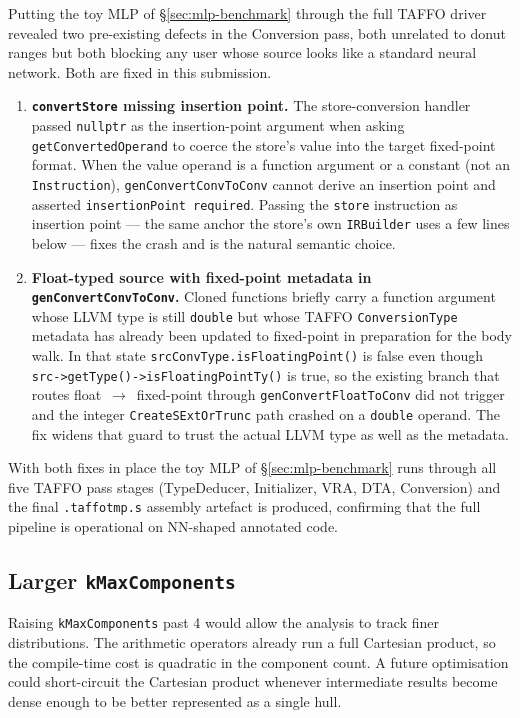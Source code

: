 \documentclass[11pt,a4paper]{article}
\theoremstyle{plain}
\begin{document}
Putting the toy MLP of \S\ref{sec:mlp-benchmark} through the full
TAFFO driver revealed two pre-existing defects in the Conversion
pass, both unrelated to donut ranges but both blocking any user
whose source looks like a standard neural network. Both are fixed
in this submission.

\begin{enumerate}
\item \textbf{\texttt{convertStore} missing insertion point.} The
  store-conversion handler passed \texttt{nullptr} as the
  insertion-point argument when asking \texttt{getConvertedOperand}
  to coerce the store's value into the target fixed-point format.
  When the value operand is a function argument or a constant (not
  an \texttt{Instruction}), \texttt{genConvertConvToConv} cannot
  derive an insertion point and asserted
  \texttt{insertionPoint required}. Passing the \texttt{store}
  instruction as insertion point --- the same anchor the store's
  own \texttt{IRBuilder} uses a few lines below --- fixes the crash
  and is the natural semantic choice.
\item \textbf{Float-typed source with fixed-point metadata in
  \texttt{genConvertConvToConv}.} Cloned functions briefly carry a
  function argument whose LLVM type is still \texttt{double} but
  whose TAFFO \texttt{ConversionType} metadata has already been
  updated to fixed-point in preparation for the body walk. In that
  state \texttt{srcConvType.isFloatingPoint()} is false even though
  \texttt{src->getType()->isFloatingPointTy()} is true, so the
  existing branch that routes float~$\to$~fixed-point through
  \texttt{genConvertFloatToConv} did not trigger and the integer
  \texttt{CreateSExtOrTrunc} path crashed on a \texttt{double}
  operand. The fix widens that guard to trust the actual LLVM type
  as well as the metadata.
\end{enumerate}

With both fixes in place the toy MLP of \S\ref{sec:mlp-benchmark}
runs through all five TAFFO pass stages (TypeDeducer, Initializer,
VRA, DTA, Conversion) and the final \texttt{.taffotmp.s} assembly
artefact is produced, confirming that the full pipeline is
operational on NN-shaped annotated code.

\subsection{Larger \texttt{kMaxComponents}}

Raising \texttt{kMaxComponents} past 4 would allow the analysis to
track finer distributions. The arithmetic operators already run a full
Cartesian product, so the compile-time cost is quadratic in the
component count. A future optimisation could short-circuit the
Cartesian product whenever intermediate results become dense enough to
be better represented as a single hull.
\end{document}
